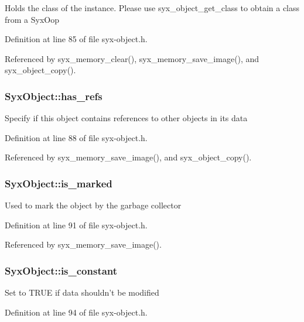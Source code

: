 Holds the class of the instance. Please use syx\_\-object\_\-get\_\-class to obtain a class from a SyxOop 

Definition at line 85 of file syx-object.h.

Referenced by syx\_\-memory\_\-clear(), syx\_\-memory\_\-save\_\-image(), and syx\_\-object\_\-copy().\hypertarget{struct_syx_object_653836c4f8256fd84d945f5b37297475}{
\subsubsection{ {\bf SyxObject::has\_\-refs}}}
\label{struct_syx_object_653836c4f8256fd84d945f5b37297475}


Specify if this object contains references to other objects in its data 

Definition at line 88 of file syx-object.h.

Referenced by syx\_\-memory\_\-save\_\-image(), and syx\_\-object\_\-copy().\hypertarget{struct_syx_object_756671a0c1dddca22d76219e5e28c2c4}{
\subsubsection{ {\bf SyxObject::is\_\-marked}}}
\label{struct_syx_object_756671a0c1dddca22d76219e5e28c2c4}


Used to mark the object by the garbage collector 

Definition at line 91 of file syx-object.h.

Referenced by syx\_\-memory\_\-save\_\-image().\hypertarget{struct_syx_object_a263627fc658b6d457bfa59962133612}{
\subsubsection{ {\bf SyxObject::is\_\-constant}}}
\label{struct_syx_object_a263627fc658b6d457bfa59962133612}


Set to TRUE if data shouldn't be modified 

Definition at line 94 of file syx-object.h.

